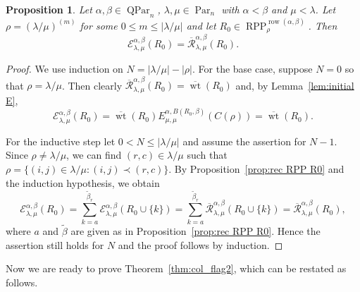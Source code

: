 \documentclass[12pt]{amsart}
\numberwithin{equation}{section}
\newtheorem{prop}[thm]{Proposition}
\theoremstyle{definition}
\newcommand\wb{\widetilde{\beta}}
\newcommand\row{\operatorname{row}}
\newcommand\Par{\operatorname{Par}}
\newcommand\QPar{\operatorname{QPar}}
\newcommand\RPP{\operatorname{RPP}}
\newcommand\lm{{\lambda/\mu}}
\newcommand\wt{\operatorname{wt}}
\newcommand\R{\mathcal{R}}
\newcommand\oR{\overline{\R}}
\newcommand\EE{\mathcal{E}}
\newcommand\owt{\overline{\wt}}
\begin{document}
\begin{prop}\label{prop:main e}
  Let $\alpha,\beta\in\QPar_n$, $\lambda,\mu\in\Par_n$ with $\alpha<\beta$ and
  $\mu<\lambda$. Let $\rho=(\lm)^{(m)}$ for some $0\le m\le|\lm|$ and let
  $R_0\in \RPP^{\row(\alpha,\beta)}_{\rho}$. Then
\[
\EE^{\alpha,\beta}_{\lambda,\mu}(R_0) = \oR^{\alpha,\beta}_{\lambda,\mu}(R_0).
\]
\end{prop}
\begin{proof}
  We use induction on $N = |\lm|-|\rho|$. For the base case, suppose $N=0$ so
  that $\rho=\lm$. Then clearly $\oR^{\alpha,\beta}_{\lambda,\mu}(R_0) =
  \owt(R_0)$ and, by Lemma~\ref{lem:initial E},
  \[
\EE^{\alpha,\beta}_{\lambda,\mu}(R_0) = \owt(R_0)
E^{\alpha,B(R_0,\beta)}_{\mu,\mu}(C(\rho)) = \owt(R_0).
  \]

  For the inductive step let $0<N\le|\lm|$ and assume the assertion for $N-1$.
  Since $\rho\ne\lm$, we can find $(r,c)\in\lm$ such that $\rho=\{(i,j)\in\lm:
  (i,j)\prec (r,c)\}$. By Proposition~\ref{prop:rec RPP R0} and the induction
  hypothesis, we obtain
\[
    \EE^{\alpha,\beta}_{\lambda,\mu}(R_0)
    = \sum_{k=a}^{\wb_r} \EE^{\alpha,\beta}_{\lambda,\mu}(R_0\cup\{k\})
    =\sum_{k=a}^{\wb_r} \oR^{\alpha,\beta}_{\lambda,\mu}(R_0\cup\{k\})
=\oR^{\alpha,\beta}_{\lambda,\mu}(R_0),
\]
where $a$ and $\wb$ are given as in Proposition~\ref{prop:rec RPP R0}.
Hence the assertion still holds for $N$ and the proof follows by induction.
\end{proof}



Now we are ready to prove Theorem~\ref{thm:col_flag2}, which can be restated as
follows.
\end{document}
